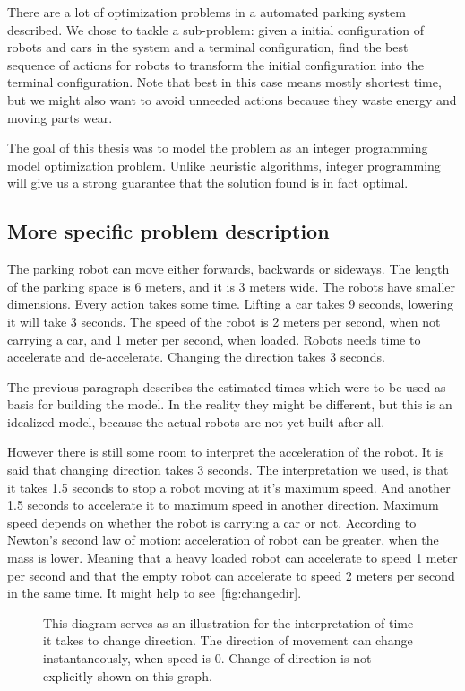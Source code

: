 There are a lot of optimization problems in a automated parking system
described. We chose to tackle a sub-problem: given a initial configuration of
robots and cars in the system and a terminal configuration, find the best
sequence of actions for robots to transform the initial configuration into the
terminal configuration. Note that best in this case means mostly shortest time,
but we might also want to avoid unneeded actions because they waste energy and
moving parts wear.

The goal of this thesis was to model the problem as an integer programming
model optimization problem. Unlike heuristic algorithms, integer programming
will give us a strong guarantee that the solution found is in fact optimal.

\subsection{More specific problem description}
The parking robot can move either forwards, backwards or sideways. The length of
the parking space is 6 meters, and it is 3 meters wide. The robots have smaller
dimensions. Every action takes some time. Lifting a car takes 9 seconds,
lowering it will take 3 seconds. The speed of the robot is 2 meters per second,
when not carrying a car, and 1 meter per second, when loaded. Robots needs time
to accelerate and de-accelerate. Changing the direction takes 3 seconds.

The previous paragraph describes the estimated times which were to be used as
basis for building the model. In the reality they might be different, but this
is an idealized model, because the actual robots are not yet built after all.

However there is still some room to interpret the acceleration of the robot. It
is said that changing direction takes 3 seconds. The interpretation we used, is
that it takes 1.5 seconds to stop a robot moving at it's maximum speed. And
another 1.5 seconds to accelerate it to maximum speed in another direction.
Maximum speed depends on whether the robot is carrying a car or not.
According to Newton's second law of motion: acceleration of robot can be
greater, when the mass is lower. Meaning that a heavy loaded robot can
accelerate to speed 1 meter per second and that the empty robot can accelerate
to speed 2 meters per second in the same time. It might help to
see~\autoref{fig:changedir}.

\begin{figure}[h]
    \begin{center}
        
        \caption{This diagram serves as an illustration for the interpretation of
            time it takes to change direction. The direction of movement can change
            instantaneously, when speed is 0. Change of direction is not explicitly shown on
            this graph.}
        \label{fig:changedir}
    \end{center}
\end{figure}


